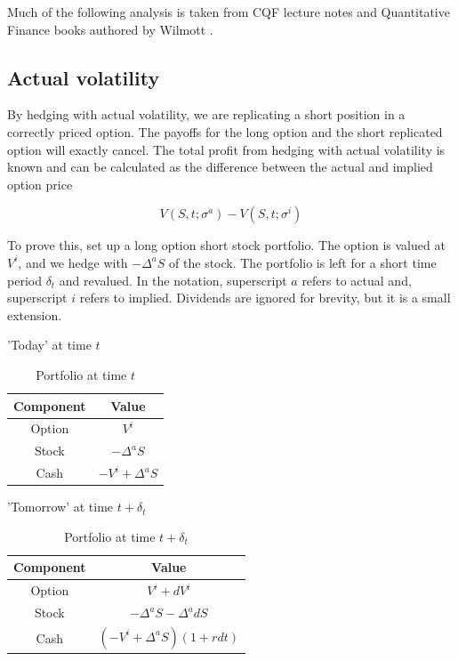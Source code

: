 \documentclass{article}
\newcommand{\para}{\vspace{8pt}} %
\begin{document}
\para
Much of the following analysis is taken from CQF lecture notes and Quantitative Finance books authored by Wilmott \cite{wilmott}.

\subsection{Actual volatility}

By hedging with actual volatility, we are replicating a short position in a correctly priced option. The payoffs for the long option and the short replicated option will
exactly cancel.  The total profit from hedging with actual volatility is known and can be calculated as the difference between the actual and implied option price

\[
V(S, t; \sigma^a) - V(S, t; \sigma^i)
\]

To prove this, set up a long option short stock portfolio. The option is valued at $V^i$, and we hedge with $-\Delta^a S$ of the stock.
The portfolio is left for a short time period $\delta_t$ and revalued.  In the notation, superscript $a$ refers to actual
and, superscript $i$ refers to implied.  Dividends are ignored for brevity, but it is a small extension.

\para
'Today' at time $t$

\begin{table}[H]
    \centering
    \begin{tabular}{|c|c|}
        \hline
        \textbf{Component} & \textbf{Value} \\
        \hline
        Option & $V^{i}$ \\
        \hline
        Stock & $-\Delta^{a}S$ \\
        \hline
        Cash & $-V^{i} + \Delta^{a}S$ \\
        \hline
    \end{tabular}
    \caption{Portfolio at time $t$}
    \label{tab:portfolio_t}
\end{table}

\para
'Tomorrow' at time $t + \delta_t$
\begin{table}[H]
    \centering
    \begin{tabular}{|c|c|}
        \hline
        \textbf{Component} & \textbf{Value} \\
        \hline
        Option & $V^{i} + dV^i$\\
        \hline
        Stock & $-\Delta^{a}S -\Delta^{a}dS$ \\
        \hline
        Cash & $(-V^{i} + \Delta^{a}S)(1 + r dt)$ \\
        \hline
    \end{tabular}
    \caption{Portfolio at time $t + \delta_{t}$}
    \label{tab:portfolio_t_plus_delta_t}
\end{table}
\end{document}
